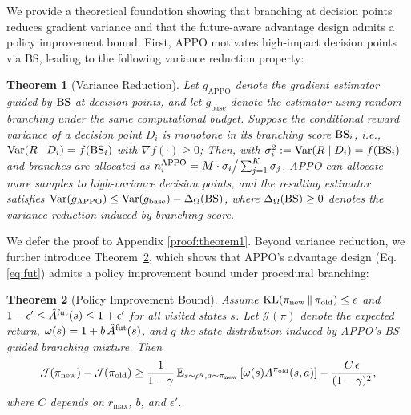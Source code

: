 \documentclass{article}
\newtheorem{theorem}{Theorem}[section]
\begin{document}
We provide a theoretical foundation showing that branching at decision points reduces gradient variance and that the future-aware advantage design admits a policy improvement bound. First, APPO motivates high-impact decision points via BS, leading to the following variance reduction property:
\vspace{-0.1cm}
\begin{theorem}[Variance Reduction]\label{theo:1}
Let $g_{\mathrm{APPO}}$ denote the gradient estimator guided by ${\rm BS}$ at decision points, and let $g_{\mathrm{base}}$ denote the estimator using random branching under the same computational budget. Suppose the conditional reward variance of a decision point $D_i$ is monotone in its branching score ${\rm BS}_i$, i.e., $\mathrm{Var}(R\mid D_i)=f({\rm BS}_i)$ with $\nabla f(\cdot)\ge 0$; Then, with $\sigma_i^2 := \mathrm{Var}(R \mid D_i) = f({\rm BS}_i)$ and branches are allocated as $n^{\rm APPO}_i= M \cdot \sigma_i \big/ \sum_{j=1}^K \sigma_j$. APPO can allocate more samples to high-variance decision points, and the resulting estimator satisfies $\mathrm{Var}(g_{\mathrm{APPO}})\le \mathrm{Var}(g_{\mathrm{base}})-\Delta_\Omega({\rm BS})$, where $\Delta_\Omega({\rm BS})\ge 0$ denotes the variance reduction induced by branching score.  
\end{theorem}
\vspace{-0.1cm}
We defer the proof to Appendix \ref{proof:theorem1}. Beyond variance reduction, we further introduce Theorem~\ref{theo:2}, which shows that APPO's advantage design (Eq.\ref{eq:fut})  admits a policy improvement bound under procedural branching:
\vspace{-0.1cm}
\begin{theorem}[Policy Improvement Bound]\label{theo:2}
Assume $\mathrm{KL}(\pi_{\rm new}\,\|\,\pi_{\rm old})\le \epsilon$ and $1-\epsilon' \le \hat{A}^{\rm fut}(s)\le 1+\epsilon'$ for all visited states $s$. Let $\mathcal{J}(\pi)$ denote the expected return, $\omega(s)=1+b\,\hat{A}^{\rm fut}(s)$,
and $q$ the state distribution induced by APPO's BS-guided branching mixture. Then
\begin{equation}
    \mathcal{J}(\pi_{\rm new}) - \mathcal{J}(\pi_{\rm old})
    \ge \frac{1}{1-\gamma}\,
    \mathbb{E}_{s \sim \rho^{q}, a \sim \pi_{\rm new}}
    \left[ \omega(s) A^{\pi_{\rm old}}(s, a) \right]
    - \frac{C\,\epsilon}{(1-\gamma)^2},
\end{equation}
where $C$ depends on $r_{\max}$, $b$, and $\epsilon'$.
\end{theorem}
\end{document}
